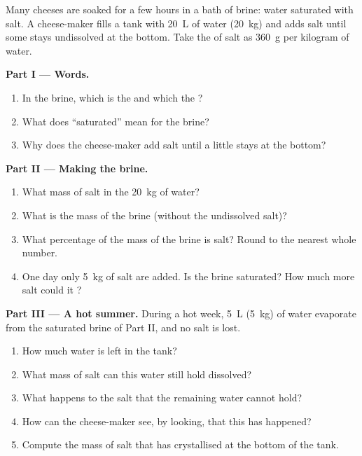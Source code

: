\begin{problem}
\label{pb:g6:solutions-and-solubility:1}
Many cheeses are soaked for a few hours in a bath of brine: water
saturated with salt. A cheese-maker fills a tank with \qty{20}{L} of
water (\qty{20}{kg}) and adds salt until some stays undissolved at the
bottom. Take the  of salt as \qty{360}{g} per kilogram of
water.

\medskip
\noindent\textbf{Part I --- Words.}
\begin{enumerate}
  \item In the brine, which is the  and which the ?
  \item What does ``saturated'' mean for the brine?
  \item Why does the cheese-maker add salt until a little stays at the
        bottom?
\end{enumerate}

\medskip
\noindent\textbf{Part II --- Making the brine.}
\begin{enumerate}[resume]
  \item What mass of salt  in the \qty{20}{kg} of water?
  \item What is the mass of the brine (without the undissolved salt)?
  \item What percentage of the mass of the brine is salt? Round to the
        nearest whole number.
  \item One day only \qty{5}{kg} of salt are added. Is the brine
        saturated? How much more salt could it ?
\end{enumerate}

\medskip
\noindent\textbf{Part III --- A hot summer.}
During a hot week, \qty{5}{L} (\qty{5}{kg}) of water evaporate from the
saturated brine of Part II, and no salt is lost.
\begin{enumerate}[resume]
  \item How much water is left in the tank?
  \item What mass of salt can this water still hold dissolved?
  \item What happens to the salt that the remaining water cannot hold?
  \item How can the cheese-maker see, by looking, that this has
        happened?
  \item Compute the mass of salt that has crystallised at the bottom of
        the tank.
\end{enumerate}
\end{problem}
